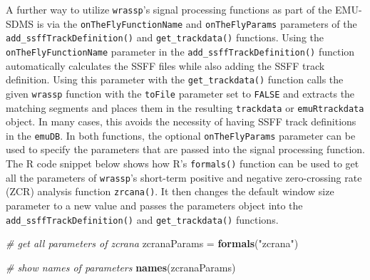 \documentclass[]{book}
\newenvironment{Shaded}{\begin{snugshade}}{\end{snugshade}}
\newcommand{\CommentTok}[1]{\textcolor[rgb]{0.56,0.35,0.01}{\textit{#1}}}
\newcommand{\DataTypeTok}[1]{\textcolor[rgb]{0.13,0.29,0.53}{#1}}
\newcommand{\DecValTok}[1]{\textcolor[rgb]{0.00,0.00,0.81}{#1}}
\newcommand{\KeywordTok}[1]{\textcolor[rgb]{0.13,0.29,0.53}{\textbf{#1}}}
\newcommand{\NormalTok}[1]{#1}
\newcommand{\OperatorTok}[1]{\textcolor[rgb]{0.81,0.36,0.00}{\textbf{#1}}}
\newcommand{\StringTok}[1]{\textcolor[rgb]{0.31,0.60,0.02}{#1}}
\theoremstyle{definition}
\theoremstyle{definition}
\theoremstyle{definition}
\theoremstyle{remark}
\begin{document}
\begin{Shaded}
\end{Shaded}

A further way to utilize \texttt{wrassp}'s signal processing functions
as part of the EMU-SDMS is via the \texttt{onTheFlyFunctionName} and
\texttt{onTheFlyParams} parameters of the
\texttt{add\_ssffTrackDefinition()} and \texttt{get\_trackdata()}
functions. Using the \texttt{onTheFlyFunctionName} parameter in the
\texttt{add\_ssffTrackDefinition()} function automatically calculates
the SSFF files while also adding the SSFF track definition. Using this
parameter with the \texttt{get\_trackdata()} function calls the given
\texttt{wrassp} function with the \texttt{toFile} parameter set to
\texttt{FALSE} and extracts the matching segments and places them in the
resulting \texttt{trackdata} or \texttt{emuRtrackdata} object. In many
cases, this avoids the necessity of having SSFF track definitions in the
\texttt{emuDB}. In both functions, the optional \texttt{onTheFlyParams}
parameter can be used to specify the parameters that are passed into the
signal processing function. The R code snippet below shows how R's
\texttt{formals()} function can be used to get all the parameters of
\texttt{wrassp}'s short-term positive and negative zero-crossing rate
(ZCR) analysis function \texttt{zrcana()}. It then changes the default
window size parameter to a new value and passes the parameters object
into the \texttt{add\_ssffTrackDefinition()} and
\texttt{get\_trackdata()} functions.

\begin{Shaded}
\begin{Highlighting}[]
\CommentTok{# get all parameters of zcrana}
\NormalTok{zcranaParams =}\StringTok{ }\KeywordTok{formals}\NormalTok{(}\StringTok{"zcrana"}\NormalTok{)}

\CommentTok{# show names of parameters}
\KeywordTok{names}\NormalTok{(zcranaParams)}
\end{Highlighting}
\end{Shaded}
\end{document}
